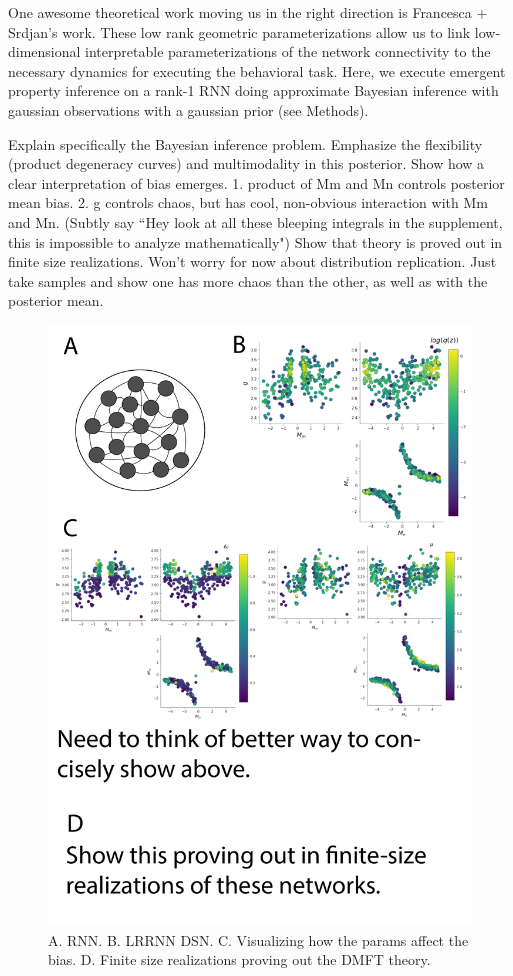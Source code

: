 \documentclass[11pt]{article}
\begin{document}
One awesome theoretical work moving us in the right direction is Francesca + Srdjan's work.  These low rank geometric parameterizations allow us to link low-dimensional interpretable parameterizations of the network connectivity to the necessary dynamics for executing the behavioral task.  Here, we execute emergent property inference on a rank-1 RNN doing approximate Bayesian inference with gaussian observations with a gaussian prior (see Methods).

Explain specifically the Bayesian inference problem.
Emphasize the flexibility (product degeneracy curves) and multimodality in this posterior.
Show how a clear interpretation of bias emerges. 
1. product of Mm and Mn controls posterior mean bias.
2. g controls chaos, but has cool, non-obvious interaction with Mm and Mn.  (Subtly say ``Hey look at all these bleeping integrals in the supplement, this is impossible to analyze mathematically")
Show that theory is proved out in finite size realizations.  Won't worry for now about distribution replication.  Just take samples and show one has more chaos than the other, as well as with the posterior mean.

\begin{figure}
\begin{center}
\includegraphics[scale=0.4]{figs/fig5/fig5.pdf}
\end{center}
\caption{A. RNN. B. LRRNN DSN.  C. Visualizing how the params affect the bias.  D. Finite size realizations proving out the DMFT theory.}
\end{figure}
\end{document}
